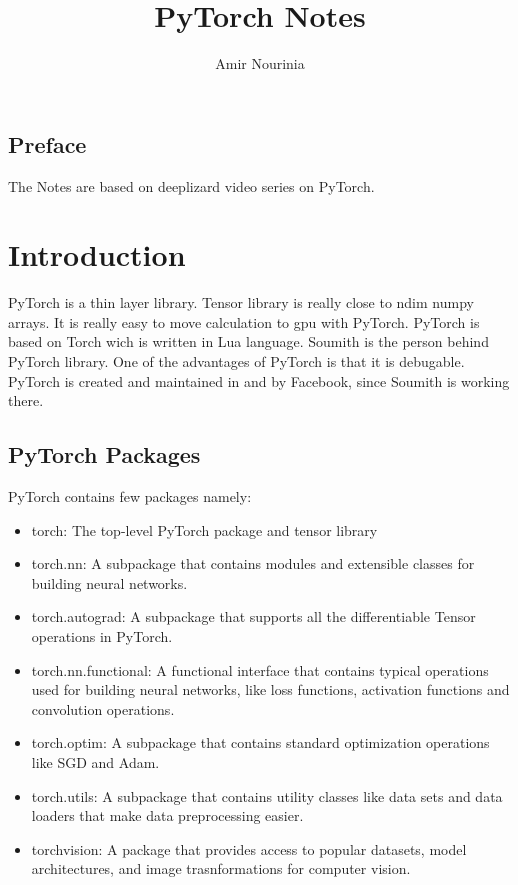 \documentclass[11pt,twoside,a4paper]{report}
\title{PyTorch Notes}
\author{Amir Nourinia}
\begin{document}
\maketitle
\tableofcontents
\section{Preface}
The Notes are based on deeplizard video series on PyTorch.
\chapter{Introduction}

PyTorch is a thin layer library. Tensor library is really close to ndim numpy arrays. It is really easy to move calculation to gpu with PyTorch.
PyTorch is based on Torch wich is written in Lua language. Soumith is the person behind PyTorch library. One of the advantages of PyTorch is that it is debugable.
PyTorch is created and maintained in and by Facebook, since Soumith is working there.

\section{PyTorch Packages}
PyTorch contains few packages namely:

\begin{itemize}
    \item torch: The top-level PyTorch package and tensor library
    \item torch.nn: A subpackage that contains modules and extensible classes for building neural networks.
    \item torch.autograd: A subpackage that supports all the differentiable Tensor operations in PyTorch.
    \item torch.nn.functional: A functional interface that contains typical operations used for building neural networks, like loss functions, activation functions and
    convolution operations.
    \item torch.optim: A subpackage that contains standard optimization operations like SGD and Adam.
    \item torch.utils: A subpackage that contains utility classes like data sets and data loaders that make data preprocessing easier.
    \item torchvision: A package that provides access to popular datasets, model architectures, and image trasnformations for computer vision.
\end{itemize}
\end{document}
